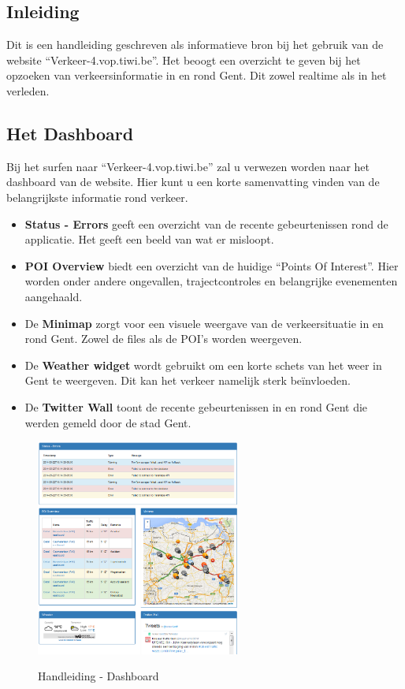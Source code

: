 \subsection{Inleiding}
Dit is een handleiding geschreven als informatieve bron bij het gebruik van de website “Verkeer-4.vop.tiwi.be”. Het beoogt een overzicht te geven bij het opzoeken van verkeersinformatie in en rond Gent. Dit zowel realtime als in het verleden.

\subsection{Het Dashboard}
Bij het surfen naar “Verkeer-4.vop.tiwi.be” zal u verwezen worden naar het dashboard van de website. Hier kunt u een korte samenvatting vinden van de belangrijkste informatie rond verkeer. 

\begin{itemize}
\item \textbf{Status - Errors} geeft een overzicht van de recente gebeurtenissen rond de applicatie. Het geeft een beeld van wat er misloopt.
\item \textbf{POI Overview} biedt een overzicht van de huidige “Points Of Interest”.  Hier worden onder andere ongevallen, trajectcontroles en belangrijke evenementen aangehaald.
\item De \textbf{Minimap} zorgt voor een visuele weergave van de verkeersituatie in en rond Gent. Zowel de files als de POI’s worden weergeven.
\item De \textbf{Weather widget} wordt gebruikt om een korte schets van het weer in Gent te weergeven. Dit kan het verkeer namelijk sterk beïnvloeden.
\item De \textbf{Twitter Wall}  toont de recente gebeurtenissen in en rond Gent die werden gemeld door de stad Gent.
\end{itemize}

\begin{figure}[H]
\centering
\includegraphics[width=0.6\textwidth]{images/dashboard.png}\\
\caption{Handleiding - Dashboard}
\end{figure}

